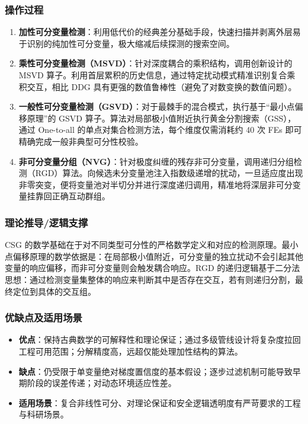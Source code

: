 \subsubsection*{操作过程}
\begin{enumerate}
    \item \textbf{加性可分变量检测}：利用低代价的经典差分基础手段，快速扫描并剥离外层易于识别的纯加性可分变量，极大缩减后续探测的搜索空间。
    \item \textbf{乘性可分变量检测（MSVD）}：针对深度耦合的乘积结构，调用创新设计的 MSVD 算子。利用首层累积的历史信息，通过特定扰动模式精准识别复合乘积交互，相比 DDG 具有更强的数值鲁棒性（避免了对数变换的数值问题）。
    \item \textbf{一般性可分变量检测（GSVD）}：对于最棘手的混合模式，执行基于“最小点偏移原理”的 GSVD 算子。算法对局部极小值附近执行黄金分割搜索（GSS），通过 One-to-all 的单点对集合检测方法，每个维度仅需消耗约 40 次 FEs 即可精确完成一般非典型可分性校验。
    \item \textbf{非可分变量分组（NVG）}：针对极度纠缠的残存非可分变量，调用递归分组检测（RGD）算法。向候选未分变量池注入指数级递增的扰动，一旦适应度出现非零突变，便将变量池对半切分并进行深度递归调用，精准地将深层非可分变量挂靠回正确互动群组。
\end{enumerate}

\subsubsection*{理论推导/逻辑支撑}
CSG 的数学基础在于对不同类型可分性的严格数学定义和对应的检测原理。最小点偏移原理的数学依据是：在局部极小值附近，可分变量的独立扰动不会引起其他变量的响应偏移，而非可分变量则会触发耦合响应。RGD 的递归逻辑基于二分法思想：通过检测变量集整体的响应来判断其中是否存在交互，若有则递归分割，最终定位到具体的交互组。

\subsubsection*{优缺点及适用场景}
\begin{itemize}
    \item \textbf{优点}：保持古典数学的可解释性和理论保证；通过多级管线设计将复杂度拉回工程可用范围；分解精度高，远超仅能处理加性结构的算法。
    \item \textbf{缺点}：仍受限于单变量绝对梯度置信度的基本假设；逐步过滤机制可能导致早期阶段的误差传递；对动态环境适应性差。
    \item \textbf{适用场景}：复合非线性可分、对理论保证和安全逻辑透明度有严苛要求的工程与科研场景。
\end{itemize}

